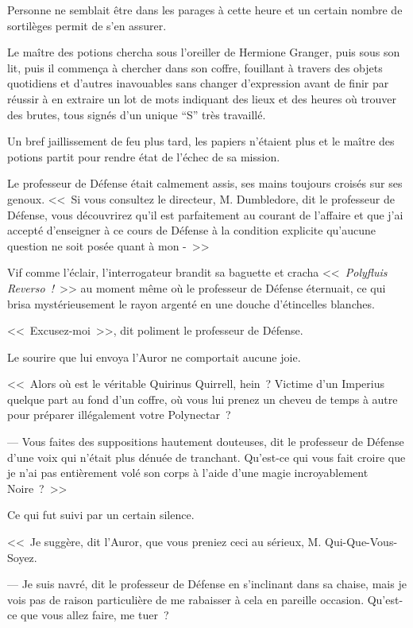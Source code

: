 Personne ne semblait être dans les parages à cette heure et un certain nombre de sortilèges permit de s'en assurer.

Le maître des potions chercha sous l'oreiller de Hermione Granger, puis sous son lit, puis il commença à chercher dans son coffre, fouillant à travers des objets quotidiens et d'autres inavouables sans changer d'expression avant de finir par réussir à en extraire un lot de mots indiquant des lieux et des heures où trouver des brutes, tous signés d'un unique “S” très travaillé.

Un bref jaillissement de feu plus tard, les papiers n'étaient plus et le maître des potions partit pour rendre état de l'échec de sa mission.

\later

Le professeur de Défense était calmement assis, ses mains toujours croisés sur ses genoux. <<~Si vous consultez le directeur, M. Dumbledore, dit le professeur de Défense, vous découvrirez qu'il est parfaitement au courant de l'affaire et que j'ai accepté d'enseigner à ce cours de Défense à la condition explicite qu'aucune question ne soit posée quant à mon -~>>

Vif comme l'éclair, l'interrogateur brandit sa baguette et cracha <<~\emph{Polyfluis Reverso~!}~>> au moment même où le professeur de Défense éternuait, ce qui brisa mystérieusement le rayon argenté en une douche d'étincelles blanches.

<<~Excusez-moi~>>, dit poliment le professeur de Défense.

Le sourire que lui envoya l'Auror ne comportait aucune joie.

<<~Alors où est le véritable Quirinus Quirrell, hein~? Victime d'un Imperius quelque part au fond d'un coffre, où vous lui prenez un cheveu de temps à autre pour préparer illégalement votre Polynectar~?

--- Vous faites des suppositions hautement douteuses, dit le professeur de Défense d'une voix qui n'était plus dénuée de tranchant. Qu'est-ce qui vous fait croire que je n'ai pas entièrement volé son corps à l'aide d'une magie incroyablement Noire~?~>>

Ce qui fut suivi par un certain silence.

<<~Je suggère, dit l'Auror, que vous preniez ceci au sérieux, M. Qui-Que-Vous-Soyez.

--- Je suis navré, dit le professeur de Défense en s'inclinant dans sa chaise, mais je vois pas de raison particulière de me rabaisser à cela en pareille occasion. Qu'est-ce que vous allez faire, me tuer~?

